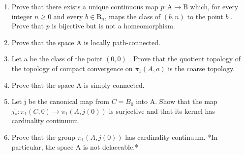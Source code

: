 \begin{enumerate}
\def\labelenumi{\alph{enumi})}
\item
  Prove that there exists a unique continuous map \(p \colon \mathrm{A} \to \mathrm{B}\) which, for every integer \(n \geqslant 0\) and every \(b \in \mathrm{B}_n\), maps the class of \((b, n)\) to the point \(b\) . Prove that \(p\) is bijective but is not a homeomorphism.
\item
  Prove that the space A is locally path-connected.
\item
  Let a be the class of the point \((0,0)\) . Prove that the quotient topology of the topology of compact convergence on \(\pi_{1}(A,a)\) is the coarse topology.
\item
  Prove that the space A is simply connected.
\item
  Let j be the canonical map from \(C = B_{0}\) into A. Show that the map \(j_{*} \colon \pi_{1}(C,0) \to \pi_{1}(A,j(0))\) is surjective and that its kernel has cardinality continuum.
\item
  Prove that the group \(\pi_{1}(A,j(0))\) has cardinality continuum. *In particular, the space A is not delaceable.*
\end{enumerate}

